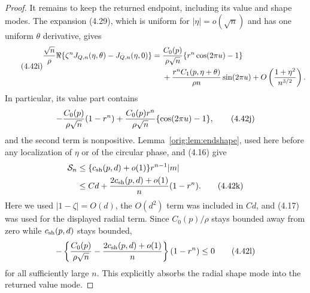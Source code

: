 \documentclass[11pt,a4paper]{article}
\numberwithin{equation}{section}
\theoremstyle{definition}
\theoremstyle{remark}
\begin{document}
\begin{proof}
It remains to keep the returned endpoint, including its value and shape
modes.  The expansion (4.29), which is uniform for
$|\eta|=o(\sqrt n)$ and has one uniform $\theta$ derivative, gives
\begin{equation}\tag{4.42i}
\begin{split}
 {\sqrt n\over\rho}\Re\{\zeta^nJ_{Q,n}(\eta,\theta)
                                  -J_{Q,n}(\eta,0)\}
 ={}&{C_0(p)\over\rho\sqrt n}
       \{r^n\cos(2\pi u)-1\}\\
 &+{r^nC_1(p,\eta+\theta)\over\rho n}\sin(2\pi u)
   +O\left({1+\eta^2\over n^{3/2}}\right).
\end{split}
\end{equation}
In particular, its value part contains
\[
 -{C_0(p)\over\rho\sqrt n}(1-r^n)
 +{C_0(p)r^n\over\rho\sqrt n}\{\cos(2\pi u)-1\},     \tag{4.42j}
\]
and the second term is nonpositive.  Lemma~\ref{orig:lem:endshape}, used here
before any localization of $\eta$ or of the circular phase, and (4.16)
give
\begin{align*}
 \mathcal S_n
 &\le\{c_{\rm sh}(p,d)+o(1)\}r^{n-1}|m|\\
 &\le Cd+{2c_{\rm sh}(p,d)+o(1)\over n}(1-r^n).
                                                               \tag{4.42k}
\end{align*}
Here we used $|1-\zeta|=O(d)$, the $O(d^2)$ term was included in $Cd$,
and (4.17) was used for the displayed radial term.  Since $C_0(p)/\rho$
stays bounded away from zero while $c_{\rm sh}(p,d)$ stays bounded,
\[
 -\left\{{C_0(p)\over\rho\sqrt n}
       -{2c_{\rm sh}(p,d)+o(1)\over n}\right\}(1-r^n)\le0          \tag{4.42l}
\]
for all sufficiently large $n$.  This explicitly absorbs the radial
shape mode into the returned value mode.


\end{proof}
\end{document}

